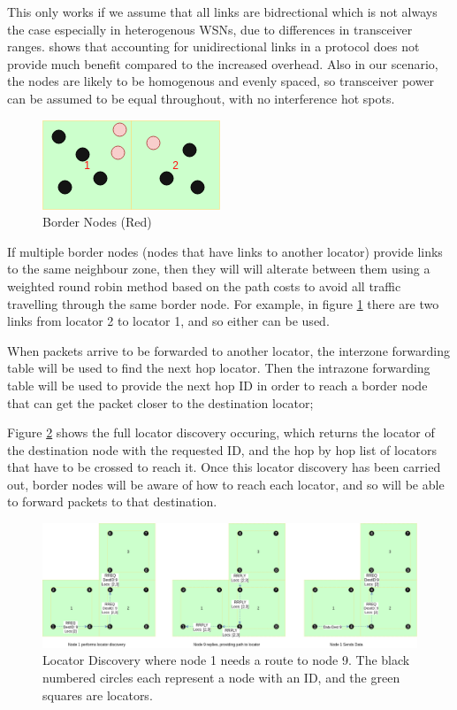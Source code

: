\documentclass[12pt]{article}
\begin{document}
This only works if we assume that all links are bidrectional which is not always the case especially in heterogenous WSNs, due to differences in transceiver ranges. 
\cite{unidirec} shows that accounting for unidirectional links in a protocol does not provide much benefit compared to the increased overhead. Also in our scenario, the nodes are likely to be homogenous and evenly spaced, so transceiver power can be assumed to be equal throughout, with no interference hot spots. 

\begin{figure}[!ht]
	\centering
	\includegraphics[width=0.5\linewidth]{images/nb}
	\caption{Border Nodes (Red)}
	\label{fig:border}
\end{figure}

If multiple border nodes (nodes that have links to another locator) provide links to the same neighbour zone, then they will will alterate between them using a weighted round robin method based on the path costs to avoid all traffic travelling through the same border node. For example, in figure \ref{fig:border} there are two links from locator 2 to locator 1, and so either can be used.

When packets arrive to be forwarded to another locator, the interzone forwarding table will be used to find the next hop locator. Then the intrazone forwarding table will be used to provide the next hop ID in order to reach a border node that can get the packet closer to the destination locator;

Figure \ref{fig:external} shows the full locator discovery occuring, which returns the locator of the destination node with the requested ID, and the hop by hop list of locators that have to be crossed to reach it.
Once this locator discovery has been carried out, border nodes will be aware of how to reach each locator, and so will be able to forward packets to that destination.

\begin{figure}[!ht]
	\centering
	\includegraphics[width=\linewidth]{images/external}
	\caption{Locator Discovery where node 1 needs a route to node 9. The black numbered circles each represent a node with an ID, and the green squares are locators.}
	\label{fig:external}
\end{figure}
\end{document}
